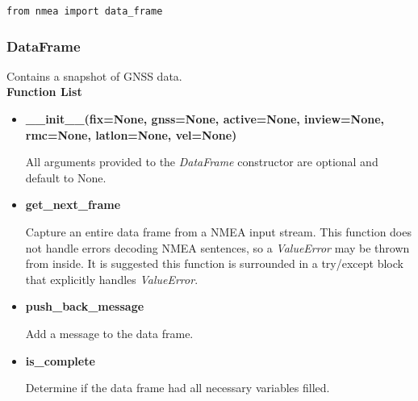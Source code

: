 
\begin{verbatim}
from nmea import data_frame
\end{verbatim}

\subsubsection{DataFrame}

Contains a snapshot of GNSS data. \\

\textbf{Function List}

\begin{itemize}
	\item \textbf{\_\_init\_\_(fix=None, gnss=None, active=None, inview=None, rmc=None, latlon=None, vel=None)}

		All arguments provided to the \emph{DataFrame} constructor are optional and default to None.

	
	\item \textbf{get\_next\_frame} \classmethod

		Capture an entire data frame from a NMEA input stream. This function does not handle errors decoding
		NMEA sentences, so a \emph{ValueError} may be thrown from inside. It is suggested this function is surrounded
		in a try/except block that explicitly handles \emph{ValueError}.
		

	\item \textbf{push\_back\_message}

		Add a message to the data frame.


\item \textbf{is\_complete} 

		Determine if the data frame had all necessary variables filled.

\end{itemize}

